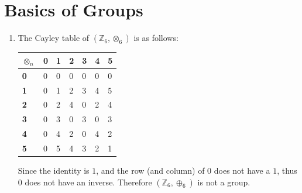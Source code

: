 \section{Basics of Groups}
\begin{enumerate}
    \item The Cayley table of $(\mathbb{Z}_6, \otimes_6)$ is as follows:

    \begin{table}[h]
        \centering
        \begin{tabular}{|l|l|l|l|l|l|l|}
        \hline
        \textbf{$\otimes_n$} & \textbf{0} & \textbf{1} & \textbf{2} & \textbf{3} & \textbf{4} & \textbf{5} \\ \hline
        \textbf{0}       & 0          & 0          & 0          & 0          & 0          & 0          \\ \hline
        \textbf{1}       & 0          & 1          & 2          & 3          & 4          & 5          \\ \hline
        \textbf{2}       & 0          & 2          & 4          & 0          & 2          & 4          \\ \hline
        \textbf{3}       & 0          & 3          & 0          & 3          & 0          & 3          \\ \hline
        \textbf{4}       & 0          & 4          & 2          & 0          & 4          & 2          \\ \hline
        \textbf{5}       & 0          & 5          & 4          & 3          & 2          & 1          \\ \hline
        \end{tabular}
    \end{table}

    Since the identity is $1$, and the row (and column) of 0 does not have a $1$, thus $0$ does not have an inverse. Therefore $(\mathbb{Z}_6, \oplus_6)$ is not a group.
    

\end{enumerate}
